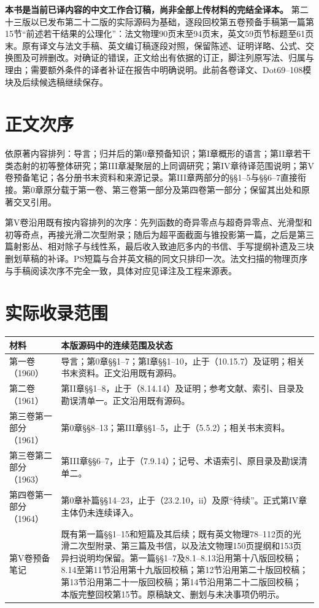 \maketitle
{}
\noindent\textbf{本书是当前已译内容的中文工作合订稿，尚非全部上传材料的完结全译本。}
第二十三版以已发布第二十二版的实际源码为基础，逐段回校第五卷预备手稿第一篇第15节“前述若干结果的公理化”：法文物理90页末至94页末，英文59页节标题至61页末。原有译文与法文手稿、英文编订稿逐段对照，保留陈述、证明详略、公式、交换图及可辨删改。对确证的错误，正文给出有依据的订正，脚注列原写法、归属与理由；需要额外条件的译者补证在报告中明确说明。此前各卷译文、Dot69--108模块及后续候选稿继续保存。

\section*{正文次序}
依原著内容排列：导言；归并后的第0章预备知识；第I章概形的语言；第II章若干类态射的初等整体研究；第III章凝聚层的上同调研究；第IV章待译范围说明；第V卷预备笔记；各分册书末资料和来源记录。第III章两部分的§§1--5与§§6--7直接衔接。第0章原分载于第一卷、第三卷第一部分及第四卷第一部分；保留其出处和原著交叉引用。

第V卷沿用既有按内容排列的次序：先列函数的奇异零点与超奇异零点、光滑型和初等奇点，再接光滑二次型附录；随后为超平面截面与锥投影第一篇，之后是第三篇射影丛、相对除子与线性系，最后收入致迪厄多内的书信、手写提纲补遗及三块删划草稿的补译。PS短篇与合并英文稿的同文只排印一次。法文扫描的物理页序与手稿阅读次序不完全一致，具体对应见译注及工程来源表。

\clearpage
\section*{实际收录范围}
\begin{longtable}{@{}p{.25\linewidth}p{.67\linewidth}@{}}
\toprule 材料&本版源码中的连续范围及状态\\\midrule\endhead
第一卷（1960）&导言；第0章§§1--7；第I章§§1--10，止于（10.15.7）及证明；相关书末资料。正文沿用既有源码。\\
第二卷（1961）&第II章§§1--8，止于（8.14.14）及证明；参考文献、索引、目录及勘误清单一。正文沿用既有源码。\\
第三卷第一部分（1961）&第0章§§8--13；第III章§§1--5，止于（5.5.2）；相关书末资料。\\
第三卷第二部分（1963）&第III章§§6--7，止于（7.9.14）；记号、术语索引、原目录及勘误清单二。\\
第四卷第一部分（1964）&第0章补篇§§14--23，止于（23.2.10，ii）及原“待续”。正式第IV章主体仍未连续译入。\\
第V卷预备笔记&既有第一篇§§1--15和短篇及其后续；既有英文物理78--112页的光滑二次型附录、第三篇及书信，以及法文物理150页提纲和153页异扫说明均保留。第一篇§§1--7及8.1--8.13沿用第十八版回校稿；8.14至第11节沿用第十九版回校稿；第12节沿用第二十版回校稿；第13节沿用第二十一版回校稿；第14节沿用第二十二版回校稿；本版完整回校第15节。原稿缺文、删划与未决事项仍明示。\\
\bottomrule
\end{longtable}

